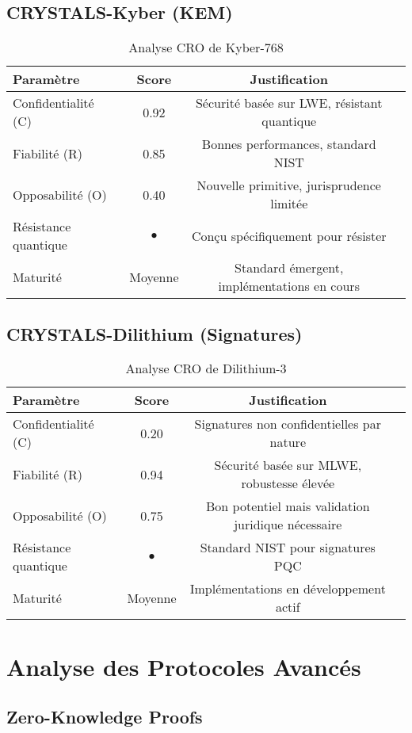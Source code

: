 \subsection{CRYSTALS-Kyber (KEM)}
\begin{table}[H]
\centering
\begin{tabular}{lccc}
\hline
\textbf{Paramètre} & \textbf{Score} & \textbf{Justification} \\
\hline
Confidentialité (C) & 0.92 & Sécurité basée sur LWE, résistant quantique \\
Fiabilité (R) & 0.85 & Bonnes performances, standard NIST \\
Opposabilité (O) & 0.40 & Nouvelle primitive, jurisprudence limitée \\
Résistance quantique & \(\bullet\) & Conçu spécifiquement pour résister \\
Maturité & Moyenne & Standard émergent, implémentations en cours \\
\hline
\end{tabular}
\caption{Analyse CRO de Kyber-768}
\end{table}

\subsection{CRYSTALS-Dilithium (Signatures)}
\begin{table}[H]
\centering
\begin{tabular}{lccc}
\hline
\textbf{Paramètre} & \textbf{Score} & \textbf{Justification} \\
\hline
Confidentialité (C) & 0.20 & Signatures non confidentielles par nature \\
Fiabilité (R) & 0.94 & Sécurité basée sur MLWE, robustesse élevée \\
Opposabilité (O) & 0.75 & Bon potentiel mais validation juridique nécessaire \\
Résistance quantique & \(\bullet\) & Standard NIST pour signatures PQC \\
Maturité & Moyenne & Implémentations en développement actif \\
\hline
\end{tabular}
\caption{Analyse CRO de Dilithium-3}
\end{table}

\section{Analyse des Protocoles Avancés}
\subsection{Zero-Knowledge Proofs}
